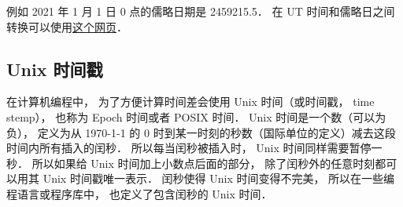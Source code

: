 例如 2021 年 1 月 1 日 0 点的儒略日期是 2459215.5． 在 UT 时间和儒略日之间转换可以使用\href{https://www.aavso.org/jd-calculator}{这个网页}．

\subsection{Unix 时间戳}
在计算机编程中， 为了方便计算时间差会使用 Unix 时间（或时间戳， time stemp）， 也称为 Epoch 时间或者 POSIX 时间． Unix 时间是一个数（可以为负）， 定义为从 1970-1-1 的 0 时到某一时刻的秒数（国际单位的定义）减去这段时间内所有插入的闰秒． 所以每当闰秒被插入时， Unix 时间同样需要暂停一秒． 所以如果给 Unix 时间加上小数点后面的部分， 除了闰秒外的任意时刻都可以用其 Unix 时间戳唯一表示． 闰秒使得 Unix 时间变得不完美， 所以在一些编程语言或程序库中， 也定义了包含闰秒的 Unix 时间．
